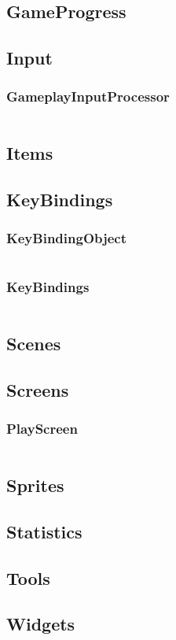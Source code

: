 \documentclass[12p]{article}
\begin{document}
\subsection{GameProgress}

\subsection{Input}
\subsubsection{GameplayInputProcessor} \label{GameplayInputProcessor.java}
\inputminted[linenos,breaklines]{java}{code/Input/GameplayInputProcessor.java}

\subsection{Items}

\subsection{KeyBindings}
\subsubsection{KeyBindingObject} \label{KeyBindingObject.java}
\inputminted[linenos,breaklines]{java}{code/KeyBindings/KeyBindingObject.java}
\subsubsection{KeyBindings} \label{KeyBindings.java}
\inputminted[linenos,breaklines]{java}{code/KeyBindings/KeyBindings.java}

\subsection{Scenes}

\subsection{Screens}
\subsubsection{PlayScreen} \label{PlayScreen.java}
\inputminted[linenos,breaklines]{java}{code/Screens/PlayScreen.java}

\subsection{Sprites}

\subsection{Statistics}

\subsection{Tools}

\subsection{Widgets}

\end{document}
